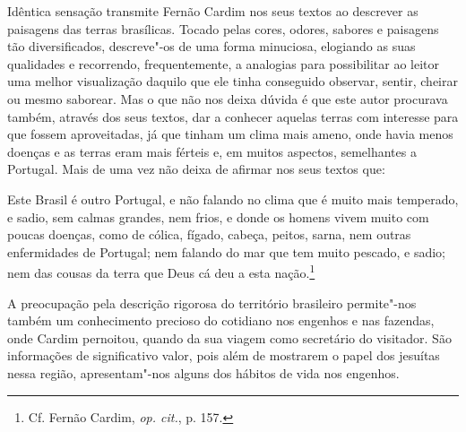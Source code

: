 Idêntica sensação transmite Fernão Cardim nos seus textos ao
descrever as paisagens das terras brasílicas. Tocado pelas cores,
odores, sabores e paisagens tão diversificados, descreve"-os de uma
forma minuciosa, elogiando as suas qualidades e recorrendo,
frequentemente, a analogias para possibilitar ao leitor uma melhor
visualização daquilo que ele tinha conseguido observar, sentir, cheirar
ou mesmo saborear. Mas o que não nos deixa dúvida é que este autor
procurava também, através dos seus textos, dar a conhecer aquelas
terras com interesse para que fossem aproveitadas, já que tinham um clima
mais ameno, onde havia menos doenças e as terras eram mais férteis e,
em muitos aspectos, semelhantes a Portugal. Mais de uma vez não deixa
de afirmar nos seus textos que:

\begin{hedraquote} 
Este Brasil é outro Portugal, e não falando no clima que é
muito mais temperado, e sadio, sem calmas grandes, nem frios, e donde
os homens vivem muito com poucas doenças, como de cólica, fígado,
cabeça, peitos, sarna, nem outras enfermidades de Portugal; nem falando
do mar que tem muito pescado, e sadio; nem das cousas da terra que Deus
cá deu a esta nação.\footnote{ Cf. Fernão Cardim, \textit{op. cit.}, p. 157.} 
\end{hedraquote}

 A preocupação pela descrição rigorosa do território
brasileiro permite"-nos também um conhecimento precioso do cotidiano
nos engenhos e nas fazendas, onde Cardim pernoitou, quando da sua
viagem como secretário do visitador. São informações de significativo
valor, pois além de mostrarem o papel dos jesuítas nessa região,
apresentam"-nos alguns dos hábitos de vida nos engenhos.




